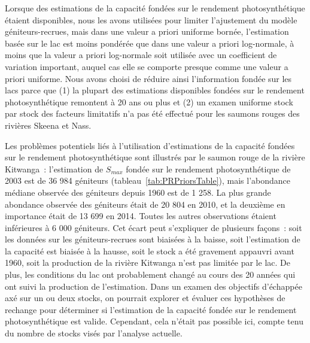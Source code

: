 \documentclass[french,11pt]{book}
\begin{document}
Lorsque des estimations de la capacité fondées sur le rendement photosynthétique étaient disponibles, nous les avons utilisées pour limiter l'ajustement du modèle géniteurs-recrues, mais dans une valeur a priori uniforme bornée, l'estimation basée sur le lac est moins pondérée que dans une valeur a priori log-normale, à moins que la valeur a priori log-normale soit utilisée avec un coefficient de variation important, auquel cas elle se comporte presque comme une valeur a priori uniforme. Nous avons choisi de réduire ainsi l'information fondée sur les lacs parce que (1) la plupart des estimations disponibles fondées sur le rendement photosynthétique remontent à 20 ans ou plus et (2) un examen uniforme stock par stock des facteurs limitatifs n'a pas été effectué pour les saumons rouges des rivières Skeena et Nass.

Les problèmes potentiels liés à l'utilisation d'estimations de la capacité fondées sur le rendement photosynthétique sont illustrés par le saumon rouge de la rivière Kitwanga~: l'estimation de \(S_{max}\) fondée sur le rendement photosynthétique de 2003 est de 36 984 géniteurs (tableau~\ref{tab:PRPriorsTable}), mais l'abondance médiane observée des géniteurs depuis 1960 est de 1 258. La plus grande abondance observée des géniteurs était de 20 804 en 2010, et la deuxième en importance était de 13 699 en 2014. Toutes les autres observations étaient inférieures à 6 000 géniteurs. Cet écart peut s'expliquer de plusieurs façons~: soit les données sur les géniteurs-recrues sont biaisées à la baisse, soit l'estimation de la capacité est biaisée à la hausse, soit le stock a été gravement appauvri avant 1960, soit la production de la rivière Kitwanga n'est pas limitée par le lac. De plus, les conditions du lac ont probablement changé au cours des 20 années qui ont suivi la production de l'estimation. Dans un examen des objectifs d'échappée axé sur un ou deux stocks, on pourrait explorer et évaluer ces hypothèses de rechange pour déterminer si l'estimation de la capacité fondée sur le rendement photosynthétique est valide. Cependant, cela n'était pas possible ici, compte tenu du nombre de stocks visés par l'analyse actuelle.

\clearpage
\end{document}
